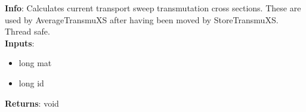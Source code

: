 \textbf{Info}: Calculates current transport sweep transmutation cross sections.
These are used by AverageTransmuXS after having been moved by StoreTransmuXS. 
Thread safe. \\

\noindent \textbf{Inputs}:
\begin{itemize}
\item{long mat}
\item{long id}
\end{itemize}

\noindent \textbf{Returns}: void
